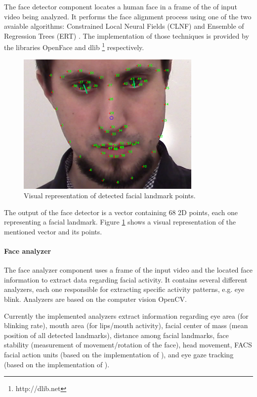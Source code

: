 The face detector component locates a human face in a frame of the of input video being analyzed. It performs the face alignment process using one of the two avaiable algorithms: Constrained Local Neural Fields (CLNF) \parencite{baltrusaitis2013constrained} and Ensemble of Regression Trees (ERT) \parencite{kazemi2014one}. The implementation of those techniques is provided by the libraries OpenFace \parencite{baltruvsaitis2016openface} and dlib \footnote{http://dlib.​net} respectively.

\begin{figure}[h]
    \centering
    \includegraphics[width=0.8\textwidth]{figures/tool-ui-face-detector.png}
    \caption{Visual representation of detected facial landmark points.}
    \label{fig:tool-ui-face-detector}
\end{figure}

The output of the face detector is a vector containing 68 2D points, each one representing a facial landmark. Figure \ref{fig:tool-ui-face-detector} shows a visual representation of the mentioned vector and its points.

\paragraph{Face analyzer}

The face analyzer component uses a frame of the input video and the located face information to extract data regarding facial activity. It contains several different analyzers, each one responsible for extracting specific activity patterns, e.g. eye blink. Analyzers are based on the computer vision OpenCV.

Currently the implemented analyzers extract information regarding eye area (for blinking rate), mouth area (for lips/mouth activity), facial center of mass (mean position of all detected landmarks), distance among facial landmarks, face stability (measurement of movement/rotation of the face), head movement, FACS facial action units (based on the implementation of \textcite{baltruvsaitis2015cross}), and eye gaze tracking (based on the implementation of \textcite{wood2015rendering}).

